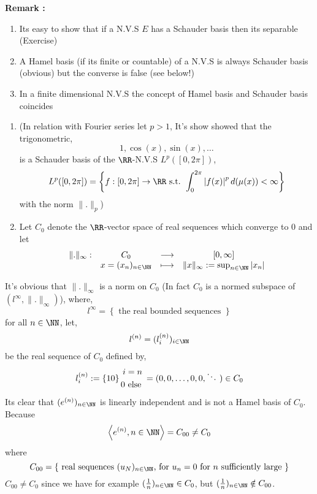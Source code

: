 \begin{center}
	\textbf{Remark : }
\end{center}
\begin{enumerate}
\item Its easy to show that if a N.V.S $E $ has a Schauder basis
	then its separable (Exercise)
\item A Hamel basis (if its finite or countable) of a N.V.S 
	is always Schauder basis (obvious) but the converse is 
	false (see below!)
\item In a finite dimensional N.V.S the concept of Hamel basis and 
	Schauder basis coincides
\end{enumerate}
\begin{example}
\begin{enumerate}
\item (In relation with Fourier series let $p > 1 $, 
	It's show showed that the trigonometric, 
	\[
	1, \cos{(x) }, \sin{(x) }, \hdots   
	\]
	is a Schauder basis of the $\RR$-N.V.S $ L^{p}([0, 2\pi]) $, 
	\[
		L^{p}([0, 2\pi])  = 
		\left\{ f : [0, 2\pi] \rightarrow  \RR 
		\text{ s.t. } 
	\int_{0}^{2\pi} \left| f(x) \right|^{p} d(\mu (x) )  
	< \infty 
\right\} 
	\]
	with the norm $\| . \|_{p} $)
\item   Let $C_{0} $  denote the 
	$\RR  $-vector space of real sequences
	which converge to $0$ and let 
	\[
	\begin{array}{cccc}
	      \| . \| _{\infty } : &  
				   C_0& \longrightarrow & 
				   [0,\infty ]\\
	
	           &  x=(x_{n}) _{n \in \NN}  & \longmapsto     & 
		\| x \| _{\infty } := 
		\sup_{n \in  \NN} \left| x_{n} \right|\\ 
	\end{array}
	\]
\end{enumerate}
It's obvious that $\| . \| _{\infty } $  
is a norm on $C_0 $ (In fact $C_0 $ is a normed subspace of 
$(l^{\infty }, \| . \| _{\infty })  $), where,
\[
	l^{\infty } = 
	\left\{ \text{ the real bounded sequences }  \right\}
\]
for all $n \in  \NN $, let,
\[
l^{(n) } = (l_{i}^{(n) })  _{i \in  \NN}
\]
be the real sequence of $C_0 $ defined by, 
\[
l_{i}^{(n) } := 
\left\{ 
	1 
	\\
	0
\right\}
\begin{gathered}  
i = n \\  
0 \text{ else } 
\end{gathered} = 
(0, 0, \hdots , 0, 0, \ddots ) 
\in  C_0
\]
Its clear that $(e^{(n) })_{n \in \NN}  $  is linearly independent 
and is not a Hamel basis of $C_0$. Because 
\[
	\left\langle e^{(n) }, n \in \NN \right\rangle  = 
	C_{00} \neq C_0 
\]
where 
\[
C_{00} = 
\left\{ \text{ real sequences $(u_{N}) _{n \in \NN} $, for 
$u_{n}=  0 $ for $n $  sufficiently large }  \right\}
\]
$C_{00} \neq  C_0 $  
since we have for example 
$(\frac{1}{n}) _{n \in  \NN} \in C_0 $, but 
$(\frac{1}{n})_{n \in \NN} \notin  C_{00}$. 


\end{example}
